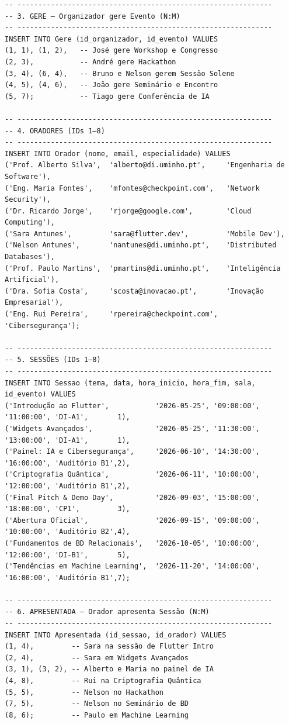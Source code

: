 \documentclass[runningheads]{llncs}
\begin{document}
\begin{small}
\begin{verbatim}
-- -------------------------------------------------------------
-- 3. GERE — Organizador gere Evento (N:M)
-- -------------------------------------------------------------
INSERT INTO Gere (id_organizador, id_evento) VALUES
(1, 1), (1, 2),   -- José gere Workshop e Congresso
(2, 3),           -- André gere Hackathon
(3, 4), (6, 4),   -- Bruno e Nelson gerem Sessão Solene
(4, 5), (4, 6),   -- João gere Seminário e Encontro
(5, 7);           -- Tiago gere Conferência de IA

-- -------------------------------------------------------------
-- 4. ORADORES (IDs 1–8)
-- -------------------------------------------------------------
INSERT INTO Orador (nome, email, especialidade) VALUES
('Prof. Alberto Silva',  'alberto@di.uminho.pt',     'Engenharia de Software'),
('Eng. Maria Fontes',    'mfontes@checkpoint.com',   'Network Security'),
('Dr. Ricardo Jorge',    'rjorge@google.com',        'Cloud Computing'),
('Sara Antunes',         'sara@flutter.dev',         'Mobile Dev'),
('Nelson Antunes',       'nantunes@di.uminho.pt',    'Distributed Databases'),
('Prof. Paulo Martins',  'pmartins@di.uminho.pt',    'Inteligência Artificial'),
('Dra. Sofia Costa',     'scosta@inovacao.pt',       'Inovação Empresarial'),
('Eng. Rui Pereira',     'rpereira@checkpoint.com',  'Cibersegurança');

-- -------------------------------------------------------------
-- 5. SESSÕES (IDs 1–8)
-- -------------------------------------------------------------
INSERT INTO Sessao (tema, data, hora_inicio, hora_fim, sala, id_evento) VALUES
('Introdução ao Flutter',           '2026-05-25', '09:00:00', '11:00:00', 'DI-A1',       1),
('Widgets Avançados',               '2026-05-25', '11:30:00', '13:00:00', 'DI-A1',       1),
('Painel: IA e Cibersegurança',     '2026-06-10', '14:30:00', '16:00:00', 'Auditório B1',2),
('Criptografia Quântica',           '2026-06-11', '10:00:00', '12:00:00', 'Auditório B1',2),
('Final Pitch & Demo Day',          '2026-09-03', '15:00:00', '18:00:00', 'CP1',         3),
('Abertura Oficial',                '2026-09-15', '09:00:00', '10:00:00', 'Auditório B2',4),
('Fundamentos de BD Relacionais',   '2026-10-05', '10:00:00', '12:00:00', 'DI-B1',       5),
('Tendências em Machine Learning',  '2026-11-20', '14:00:00', '16:00:00', 'Auditório B1',7);

-- -------------------------------------------------------------
-- 6. APRESENTADA — Orador apresenta Sessão (N:M)
-- -------------------------------------------------------------
INSERT INTO Apresentada (id_sessao, id_orador) VALUES
(1, 4),         -- Sara na sessão de Flutter Intro
(2, 4),         -- Sara em Widgets Avançados
(3, 1), (3, 2), -- Alberto e Maria no painel de IA
(4, 8),         -- Rui na Criptografia Quântica
(5, 5),         -- Nelson no Hackathon
(7, 5),         -- Nelson no Seminário de BD
(8, 6);         -- Paulo em Machine Learning


\end{verbatim}
\end{small}
\end{document}
